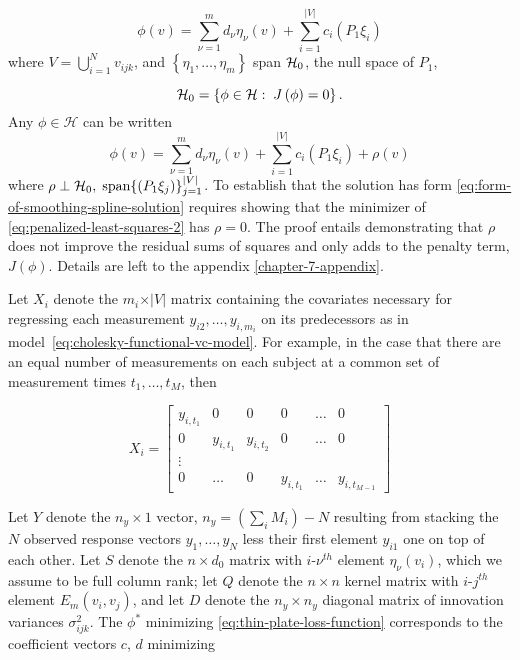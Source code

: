 \begin{equation} \label{eq:form-of-smoothing-spline-solution}
\phi\left( v \right) = \sum_{\nu=1}^{m} d_\nu \eta_\nu \left( v \right) + \sum_{i = 1}^{\vert V \vert} c_{i}\left(P_1 \xi_i \right)
\end{equation}
\noindent
where $V = \bigcup\limits_{i = 1}^N v_{ijk}$, and $\left\{\eta_1,\dots, \eta_{m}\right\}$ span $\mathcal{H}_0$, the null space of $P_1$,

\begin{equation*}
\mathcal{H}_0 = \left\{ \phi \in \mathcal{H}:\;J\left( \phi \right) = 0 \right\}.
\end{equation*}
\noindent
Any $\phi \in \mathcal{H}$ can be written 
\begin{equation} \label{eq:smoothing-spline-representer-expansion-1}
\phi\left( v \right) = \sum_{\nu=1}^{m} d_\nu \eta_\nu \left( v \right) + \sum_{i = 1}^{\vert V \vert} c_{i}\left(P_1 \xi_i \right) + \rho\left(v\right)
\end{equation}
\noindent
where $\rho \perp \mathcal{H}_0,\; \textup{span}\lbrace \left(P_1 \xi_{j} \right) \rbrace_{j = 1}^{\vert V\vert}$. To establish that the solution has form \ref{eq:form-of-smoothing-spline-solution} requires showing that the minimizer of \ref{eq:penalized-least-squares-2} has $\rho = 0$. The proof entails demonstrating that $\rho$ does not improve the residual sums of squares and only adds to the penalty term, $J\left(\phi\right)$. Details are left to the appendix \ref{chapter-7-appendix}.

Let $X_i$ denote the $m_i \times \vert V \vert$ matrix containing the covariates necessary for regressing each measurement $y_{i2}, \dots, y_{i,m_i}$ on its predecessors as in model~\ref{eq:cholesky-functional-vc-model}. For example, in the case that there are an equal number of measurements on each subject at a common set of measurement times $t_1,\dots, t_M$, then 

\begin{equation}
X_i =  \begin{bmatrix} 
y_{i, t_1} & 0 & 0 &0& \dots & 0 \\
 0 & y_{i, t_1} &  y_{i, t_2}&0 & \dots & 0 \\
 \vdots &&&&&\\
 0 & \dots &0 & y_{i,t_1} & \dots &  y_{i, t_{M-1}}
\end{bmatrix}
\end{equation}


Let $Y$ denote the $n_y \times 1$ vector, $n_y=\left(\sum \limits_{i} M_i \right) - N$ resulting from stacking the $N$ observed response vectors $y_1,\dots, y_N$ less their first element $y_{i1}$ one on top of each other. Let $S$ denote the $n \times d_0$ matrix with $i$-$\nu^{th}$ element $\eta_\nu\left(v_i\right)$, which we assume to be full column rank; let $Q$ denote the $n \times n$ kernel matrix with $i$-$j^{th}$ element $E_m\left(v_i, v_j\right)$, and let $D$ denote the $n_y \times n_y$ diagonal matrix of innovation variances $\sigma^2_{ijk}$. The $\phi^*$ minimizing \ref{eq:thin-plate-loss-function} corresponds to the coefficient vectors $c$, $d$ minimizing

